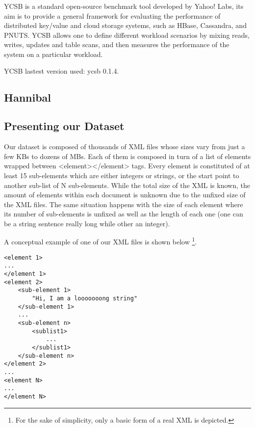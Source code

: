 YCSB\cite{cooper2010benchmarking} is a standard open-source benchmark tool developed by Yahoo! Labs, its aim is to provide a general framework for evaluating the performance of distributed key/value and cloud storage systems, such as HBase, Cassandra, and PNUTS. YCSB allows one to define different workload scenarios by mixing reads, writes, updates and table scans, and then measures the performance of the system on a particular workload.
\par
{}
\par
YCSB lastest version \cite{YCSB} used: ycsb 0.1.4.

\subsection{Hannibal}



\subsection{Presenting our Dataset}

Our dataset is composed of thousands of XML files whose sizes vary from just a few KBs to dozens of MBs. Each of them is composed in turn of a list of elements wrapped between <element></element> tags. Every element is constituted of at least 15 sub-elements which are either integers or strings, or the start point to another sub-list of N sub-elements. While the total size of the XML is known, the amount of elements within each document is unknown due to the unfixed size of the XML files. The same situation happens with the size of each element where its number of sub-elements is unfixed as well as the length of each one (one can be a string sentence really long while other an integer).
\par
A conceptual example of one of our XML files is shown below \footnote{For the sake of simplicity, only a basic form of a real XML is depicted.}.

\lstset{language=XML, basicstyle=\footnotesize, numbers=left, breaklines=true}
\begin{lstlisting}
<element 1>
...
</element 1>
<element 2>
	<sub-element 1>
		"Hi, I am a looooooong string"
	</sub-element 1>
	...
	<sub-element n>
		<sublist1>
			...
		</sublist1>
	</sub-element n>
</element 2>
...
<element N>
...
</element N>
\end{lstlisting}

